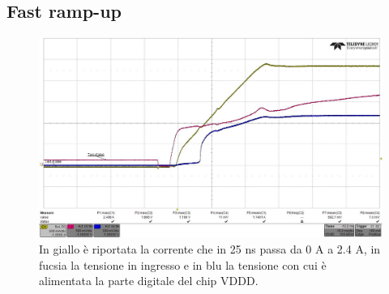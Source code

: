\subsection{Fast ramp-up}
\begin{figure}
\centering
\includegraphics[scale=.3]{Immagini/rd-powup-dir6}
\caption{In giallo è riportata la corrente che in 25 ns passa da 0 A a 2.4 A, in fucsia la tensione in ingresso e in blu la tensione con cui è alimentata la parte digitale del chip VDDD.}
\label{rd-powup-dir6}
\end{figure}


